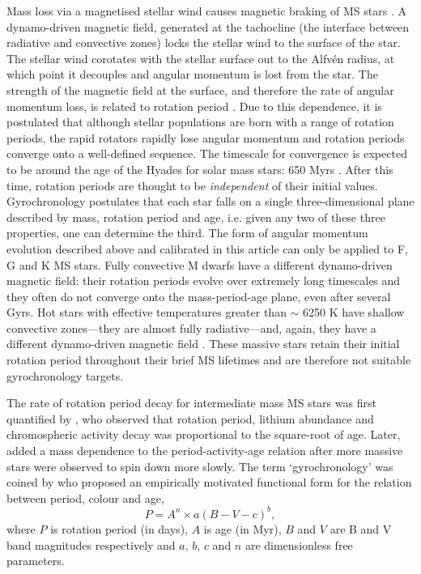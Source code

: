 \documentclass[useAMS, usenatbib]{mn2e}
\begin{document}
Mass loss via a magnetised stellar wind causes magnetic braking of MS stars
\citep{Weber1967}.
A dynamo-driven magnetic field, generated at the tachocline (the interface
between radiative and convective zones) locks the stellar wind to the surface
of the star.
The stellar wind corotates with the stellar surface out to the Alfv\'{e}n
radius, at which point it decouples and angular momentum is lost from the
star.
The strength of the magnetic field at the surface, and therefore the rate of
angular momentum loss, is related to rotation period \citep{Kawaler1988}.
Due to this dependence, it is postulated that although stellar populations
are born with a range of rotation periods, the rapid rotators rapidly lose
angular momentum and rotation periods converge onto a well-defined sequence.
The timescale for convergence is expected to be around the age of the Hyades
for solar mass stars: 650 Myrs \citep{Radick1987, Irwin2009}.
After this time, rotation periods are thought to be \emph{independent} of their
initial values.  %
Gyrochronology postulates that each star falls on a single three-dimensional
plane described by mass, rotation period and age, i.e. given any two of these
three properties, one can determine the third.
The form of angular momentum evolution described above and calibrated in this
article can only be applied to F, G and K MS stars.
Fully convective M dwarfs have a different dynamo-driven magnetic field: their
rotation periods evolve over extremely long timescales and they often do not
converge onto the mass-period-age plane, even after several Gyrs.
Hot stars with effective temperatures greater than $\sim$ 6250 K have shallow
convective zones---they are almost fully radiative---and, again, they have
a different dynamo-driven magnetic field \citep{Kraft1967}.
These massive stars retain their initial rotation period throughout their
brief MS lifetimes and are therefore not suitable gyrochronology targets.

The rate of rotation period decay for intermediate mass MS stars was first
quantified by \citet{Skumanich1972}, who observed that rotation period,
lithium abundance and chromospheric activity decay was proportional to the
square-root of age.
Later, \citet{Noyes1984_2} added a mass dependence to the period-activity-age
relation after more massive stars were observed to spin down more slowly.
The term `gyrochronology' was coined by \citet{Barnes2003} who proposed an
empirically motivated functional form for the relation between period, colour
and age, \begin{equation} \label{eq:Barnes2007_2} P = A^n \times a(B-V-c)^b,
\end{equation} where $P$ is rotation period (in days), $A$ is age (in Myr),
$B$ and $V$ are B and V band magnitudes respectively and $a$, $b$, $c$ and $n$
are dimensionless free parameters.  %
\end{document}
